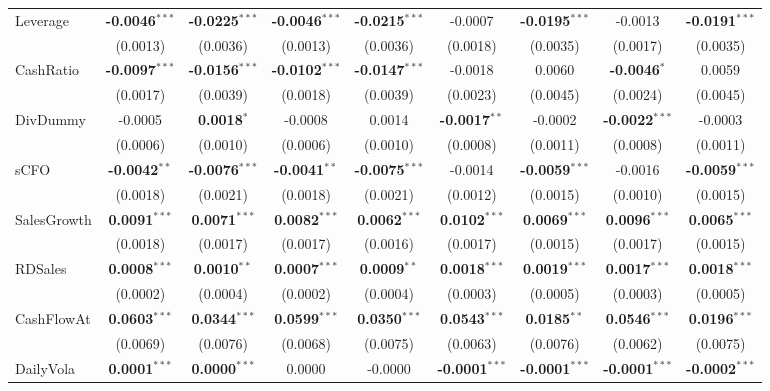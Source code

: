 \documentclass[11pt,a4paper]{article}
\begin{document}
\begin{table}[htbp]
\begin{tabular}{lcccccccc}
Leverage & \textbf{-0.0046}$^{***}$ & \textbf{-0.0225}$^{***}$ & \textbf{-0.0046}$^{***}$ & \textbf{-0.0215}$^{***}$ & -0.0007 & \textbf{-0.0195}$^{***}$ & -0.0013 & \textbf{-0.0191}$^{***}$ \\
 & (0.0013) & (0.0036) & (0.0013) & (0.0036) & (0.0018) & (0.0035) & (0.0017) & (0.0035) \\
CashRatio & \textbf{-0.0097}$^{***}$ & \textbf{-0.0156}$^{***}$ & \textbf{-0.0102}$^{***}$ & \textbf{-0.0147}$^{***}$ & -0.0018 & 0.0060 & \textbf{-0.0046}$^{*}$ & 0.0059 \\
 & (0.0017) & (0.0039) & (0.0018) & (0.0039) & (0.0023) & (0.0045) & (0.0024) & (0.0045) \\
DivDummy & -0.0005 & \textbf{0.0018}$^{*}$ & -0.0008 & 0.0014 & \textbf{-0.0017}$^{**}$ & -0.0002 & \textbf{-0.0022}$^{***}$ & -0.0003 \\
 & (0.0006) & (0.0010) & (0.0006) & (0.0010) & (0.0008) & (0.0011) & (0.0008) & (0.0011) \\
sCFO & \textbf{-0.0042}$^{**}$ & \textbf{-0.0076}$^{***}$ & \textbf{-0.0041}$^{**}$ & \textbf{-0.0075}$^{***}$ & -0.0014 & \textbf{-0.0059}$^{***}$ & -0.0016 & \textbf{-0.0059}$^{***}$ \\
 & (0.0018) & (0.0021) & (0.0018) & (0.0021) & (0.0012) & (0.0015) & (0.0010) & (0.0015) \\
SalesGrowth & \textbf{0.0091}$^{***}$ & \textbf{0.0071}$^{***}$ & \textbf{0.0082}$^{***}$ & \textbf{0.0062}$^{***}$ & \textbf{0.0102}$^{***}$ & \textbf{0.0069}$^{***}$ & \textbf{0.0096}$^{***}$ & \textbf{0.0065}$^{***}$ \\
 & (0.0018) & (0.0017) & (0.0017) & (0.0016) & (0.0017) & (0.0015) & (0.0017) & (0.0015) \\
RDSales & \textbf{0.0008}$^{***}$ & \textbf{0.0010}$^{**}$ & \textbf{0.0007}$^{***}$ & \textbf{0.0009}$^{**}$ & \textbf{0.0018}$^{***}$ & \textbf{0.0019}$^{***}$ & \textbf{0.0017}$^{***}$ & \textbf{0.0018}$^{***}$ \\
 & (0.0002) & (0.0004) & (0.0002) & (0.0004) & (0.0003) & (0.0005) & (0.0003) & (0.0005) \\
CashFlowAt & \textbf{0.0603}$^{***}$ & \textbf{0.0344}$^{***}$ & \textbf{0.0599}$^{***}$ & \textbf{0.0350}$^{***}$ & \textbf{0.0543}$^{***}$ & \textbf{0.0185}$^{**}$ & \textbf{0.0546}$^{***}$ & \textbf{0.0196}$^{***}$ \\
 & (0.0069) & (0.0076) & (0.0068) & (0.0075) & (0.0063) & (0.0076) & (0.0062) & (0.0075) \\
DailyVola & \textbf{0.0001}$^{***}$ & \textbf{0.0000}$^{***}$ & 0.0000 & -0.0000 & \textbf{-0.0001}$^{***}$ & \textbf{-0.0001}$^{***}$ & \textbf{-0.0001}$^{***}$ & \textbf{-0.0002}$^{***}$ \\

\end{tabular}
\end{table}
\end{document}

